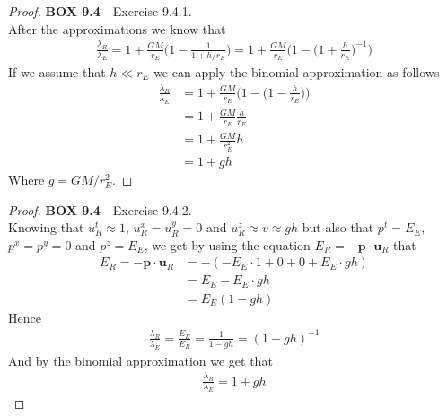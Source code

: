 \documentclass[11pt]{article}
\theoremstyle{definition}
\begin{document}
\begin{proof}{\textbf{BOX 9.4} - Exercise 9.4.1.}\\
    After the approximations we know that
    \begin{align*}
        \frac{\lambda_R}{\lambda_E}
        = 1 + \frac{GM}{r_E}\bigg(1 - \frac{1}{1 + h/r_E}\bigg)
        = 1 + \frac{GM}{r_E}\bigg(1 - \bigg(1 + \frac{h}{r_E}\bigg)^{-1}\bigg)
    \end{align*}
    If we assume that $h \ll r_E$ we can apply the binomial approximation
    as follows
    \begin{align*}
        \frac{\lambda_R}{\lambda_E}
        &= 1 + \frac{GM}{r_E}\bigg(1 - \bigg(1 - \frac{h}{r_E}\bigg)\bigg)\\
        &= 1 + \frac{GM}{r_E} \frac{h}{r_E}\\
        &= 1 + \frac{GM}{r_E^2}h\\
        &= 1 + gh
    \end{align*}
    Where $g = GM/r_E^2$.
\end{proof}
\begin{proof}{\textbf{BOX 9.4} - Exercise 9.4.2.}\\
    Knowing that $u^t_R \approx 1$, $u^x_R = u^y_R = 0$ and $u^z_R \approx v \approx gh$
    but also that $p^t = E_E$, $p^x = p^y = 0$ and $p^z = E_E$, we get by
    using the equation $E_R = -\bm{p}\cdot\bm{u}_R$ that
    \begin{align*}
        E_R = -\bm{p}\cdot\bm{u}_R
        &= -(-E_E\cdot 1 + 0 + 0 + E_E \cdot gh)\\
        &= E_E - E_E \cdot gh\\
        &= E_E(1 - gh)
    \end{align*}
    Hence
    \begin{align*}
        \frac{\lambda_R}{\lambda_E} = \frac{E_E}{E_R} = \frac{1}{1 - gh}
        = (1 - gh)^{-1}
    \end{align*}
    And by the binomial approximation we get that
    \begin{align*}
        \frac{\lambda_R}{\lambda_E} = 1 + gh
    \end{align*}
\end{proof}
\cleardoublepage
\end{document}
